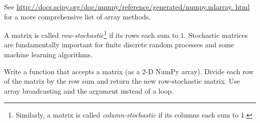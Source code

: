 See \url{http://docs.scipy.org/doc/numpy/reference/generated/numpy.ndarray.
html} for a more comprehensive list of array methods.

\begin{problem} %
A matrix is called \emph{row-stochastic}\footnote{Similarly, a matrix is called \emph{column-stochastic} if its columns each sum to $1$.} if its rows each sum to $1$.
Stochastic matrices are fundamentally important for finite discrete random processes and some machine learning algorithms.

Write a function that accepts a matrix (as a 2-D NumPy array).
Divide each row of the matrix by the row sum and return the new row-stochastic matrix.
Use array broadcasting and the  argument instead of a loop.
\end{problem}

